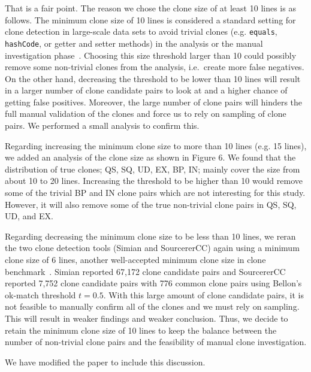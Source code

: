 \documentclass[a4paper,twoside,10pt]{reviewresponse}
\begin{document}
That is a fair point. The reason we chose the clone size of at least 10 lines is as follows. The minimum clone size of 10 lines is considered a standard setting for clone detection in large-scale data sets to avoid trivial clones (e.g. \texttt{equals}, \texttt{hashCode}, or getter and setter methods) in the analysis or the manual investigation phase~\citep{Sajnani2016}. 
Choosing this size threshold larger than 10 could possibly remove some non-trivial clones from the analysis, i.e.~create more false negatives.
On the other hand, decreasing the threshold to be lower than 10 lines will result in a larger number of clone candidate pairs to look at and a higher chance of getting false positives. Moreover, the large number of clone pairs will hinders the full manual validation of the clones and force us to rely on sampling of clone pairs. We performed a small analysis to confirm this.

Regarding increasing the minimum clone size to more than 10 lines (e.g. 15 lines), we added an analysis of the clone size as shown in Figure 6. We found that the distribution of true clones; QS, SQ, UD, EX, BP, IN; mainly cover the size from about 10 to 20 lines. Increasing the threshold to be higher than 10 would remove some of the trivial BP and IN clone pairs which are not interesting for this study. However, it will also remove some of the true non-trivial clone pairs in QS, SQ, UD, and EX.

Regarding decreasing the minimum clone size to be less than 10 lines, we reran the two clone detection tools (Simian and SourcererCC) again using a minimum clone size of 6 lines, another well-accepted minimum clone size in clone benchmark~\citep{Bellon2007}. Simian reported 67,172 clone candidate pairs and SourcererCC reported 7,752 clone candidate pairs with 776 common clone pairs using Bellon's ok-match threshold $t=0.5$. With this large amount of clone candidate pairs, it is not feasible to manually confirm all of the clones and we must rely on sampling. This will result in weaker findings and weaker conclusion. Thus, we decide to retain the minimum clone size of 10 lines to keep the balance between the number of non-trivial clone pairs and the feasibility of manual clone investigation.

We have modified the paper to include this discussion.

\end{document}
